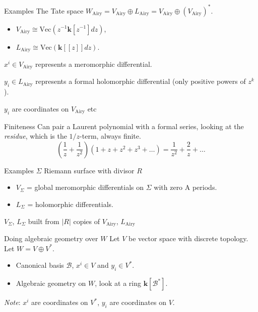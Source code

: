     
    \begin{frame}{Examples}
       The Tate space \(W_{\text{Airy}}= V_{\text{Airy}} \oplus L_{\text{Airy}} = V_{\text{Airy}} \oplus (V_{\text{Airy}})^* \).
        \begin{itemize}
            \item   \(V_{\text{Airy}} \cong \mathrm{Vec}( z^{-1} \mathbf{k}[z^{-1}]dz)\),
            \item \(L_{\text{Airy}} \cong  \mathrm{Vec}(\mathbf{k}[\![z]\!]dz)\). 
        \end{itemize}
        \(x^i \in V_{\text{Airy}}\) represents a meromorphic differential. 
        
        \(y_i \in L_{\text{Airy}}  \) represents a formal holomorphic differential (only positive powers of \(z^k\)).
        
        \(y_i\) are coordinates on \(V_{\text{Airy}}\) etc
        
    \end{frame}
    
    \begin{frame}{Finiteness}
    Can pair a Laurent polynomial with a formal series, looking at the \emph{residue}, which is the \(1/z\)-term, always finite.
    \[ \left(\frac{1}{z} + \frac{1}{z^2}\right) \left( 1 + z + z^2 + z^3 + \dots \right) = \frac{1}{z^2} + \frac{2}{z}+\dots\]
    \end{frame}
    
    
    \begin{frame}{Examples}
             \( \Sigma \) Riemann surface with divisor \(R\) 
            \begin{itemize}
                \item \(V_\Sigma\) = global meromorphic differentials on \(\Sigma\) with zero A periods. 
                \item \(L_\Sigma \) = holomorphic differentials.
            \end{itemize}
            \(V_\Sigma\), \(L_\Sigma\) built from \(|R|\) copies of \(V_{\text{Airy}}\), \(L_{\text{Airy}}\)
    \end{frame}
    
    \begin{frame}{Doing algebraic geometry over \(W\)}
        Let \(V\) be vector space with discrete topology. Let \(W = V \oplus V^*\).
        \begin{itemize}
            \item Canonical basis \(\mathcal{B}\), \(  x^i \in V\) and \( y_i \in V^*\).
            \item Algebraic geometry on \(W\), look at a ring \( \mathbf{k}[\mathcal{B}^*]\).
        \end{itemize}
        \emph{Note}: \(x^i\) are coordinates on \(V^*\), 
        \(y_i\) are coordinates on \(V\). 

    \end{frame}


